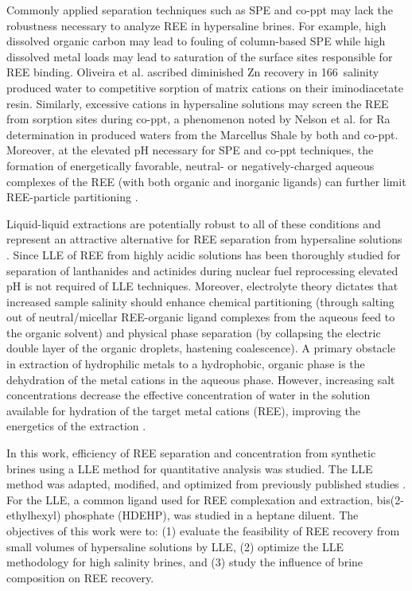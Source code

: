 Commonly applied separation techniques such as SPE and co-ppt may lack the robustness necessary to analyze REE in hypersaline brines.
For example, high dissolved organic carbon may lead to fouling of column-based SPE while high dissolved metal loads may lead to saturation of the surface sites responsible for REE binding.
Oliveira et al. \citep{Oliveira_JAAS_2011} ascribed diminished Zn recovery in 166\textperthousand\ salinity produced water to competitive sorption of matrix cations on their iminodiacetate resin.
Similarly, excessive cations in hypersaline solutions may screen the REE from sorption sites during co-ppt, a phenomenon noted by Nelson et al. \citep{Nelson_ESTL_2014} for Ra determination in produced waters from the Marcellus Shale by both  and  co-ppt.
Moreover, at the elevated pH necessary for SPE and co-ppt techniques, the formation of energetically favorable, neutral- or negatively-charged aqueous complexes of the REE (with both organic and inorganic ligands) can further limit REE-particle partitioning \citep{Erel_GCA_1993}. 

Liquid-liquid extractions are potentially robust to all of these conditions and represent an attractive alternative for REE separation from hypersaline solutions \citep{Nash_SXIX_1993}.
Since LLE of REE from highly acidic solutions has been thoroughly studied for separation of lanthanides and actinides during nuclear fuel reprocessing \citep[e.g. refs.][]{Weaver_ORNL_1964, Nilsson_SXIX_2007} elevated pH is not required of LLE techniques.
Moreover, electrolyte theory dictates that increased sample salinity should enhance chemical partitioning (through salting out of neutral/micellar REE-organic ligand complexes from the aqueous feed to the organic solvent) and physical phase separation (by collapsing the electric double layer of the organic droplets, hastening coalescence).
A primary obstacle in extraction of hydrophilic metals to a hydrophobic, organic phase is the dehydration of the metal cations in the aqueous phase.
However, increasing salt concentrations decrease the effective concentration of water in the solution available for hydration of the target metal cations (REE), improving the energetics of the extraction \citep{Nash_SXIX_1993}.

In this work, efficiency of REE separation and concentration from synthetic brines using a LLE method for quantitative analysis was studied.
The LLE method was adapted, modified, and optimized from previously published studies \citep{Shabani_AC_1990, Lawrence_GGR_2007}.
For the LLE, a common ligand used for REE complexation and extraction, bis(2-ethylhexyl) phosphate (HDEHP), was studied in a heptane diluent.
The objectives of this work were to: (1) evaluate the feasibility of REE recovery from small volumes of hypersaline solutions by LLE, (2) optimize the LLE methodology for high salinity brines, and (3) study the influence of brine composition on REE recovery.

